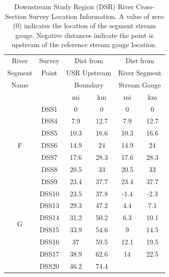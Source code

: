 \begin{table}[htbp]
	\centering
	\caption[Downstream Study Region (DSR) River Cross-Section Survey Location Information.]{Downstream Study Region (DSR) River Cross-Section Survey Location Information.  A value of zero (0) indicates the location of the segment stream gauge.  Negative distances indicate the point is upstream of the reference stream gauge location.}
	\label{tab:DSRSurveyLoc}
	\begin{tabular}{cccccc}
		\toprule
		River                        & Survey &  \multicolumn{2}{c}{Dist from}   &   \multicolumn{2}{c}{Dist from}   \\
		Segment                       & Point  & \multicolumn{2}{c}{USR Upstream} & \multicolumn{2}{c}{River Segment} \\
		Name                         &        &   \multicolumn{2}{c}{Boundary}   & \multicolumn{2}{c}{Stream Gauge}  \\
		\cmidrule(r{0.5em}l){3-4} \cmidrule(r{0.5em}l){5-6} &        &  mi  &            km             &  mi  &             km             \\ \toprule
		\multirow{7}{*}{F}                  &  DSS1  &  0   &             0             &  0   &             0              \\
		&  DSS4  & 7.9  &           12.7            & 7.9  &            12.7            \\
		&  DSS5  & 10.3 &           16.6            & 10.3 &            16.6            \\
		&  DSS6  & 14.9 &            24             & 14.9 &             24             \\
		&  DSS7  & 17.6 &           28.3            & 17.6 &            28.3            \\
		&  DSS8  & 20.5 &            33             & 20.5 &             33             \\
		&  DSS9  & 23.4 &           37.7            & 23.4 &            37.7            \\ \midrule
		\multirow{6}{*}{G}                  & DSS10  & 23.5 &           37.8            & -1.4 &            -2.3            \\
		& DSS13  & 29.3 &           47.2            & 4.4  &            7.1             \\
		& DSS14  & 31.2 &           50.2            & 6.3  &            10.1            \\
		& DSS15  & 33.9 &           54.6            &  9   &            14.5            \\
		& DSS16  &  37  &           59.5            & 12.1 &            19.5            \\
		& DSS17  & 38.9 &           62.6            &  14  &            22.5            \\ \midrule
		& DSS20  & 46.2 &           74.4            &      &  \\ \bottomrule
	\end{tabular}
\end{table}

